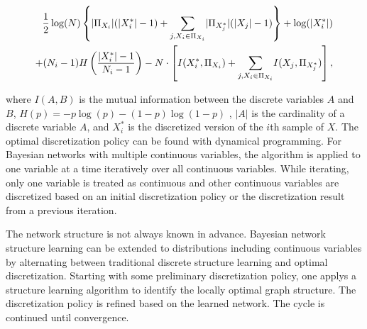 \begin{equation}
\begin{aligned}
\frac{1}{2} \log(N) \left\lbrace  \lvert \Pi_{X_i} \rvert (\lvert X^*_i \rvert - 1) +
 {\sum_{j,X_i \in \Pi_{X_i}}} \lvert \Pi_{X^*_j} \rvert (\lvert X_j \rvert - 1) \right\rbrace + \log(\lvert {X^*_i} \rvert) \\
 + (N_i-1) H \left( {{|X^*_i| - 1}\over{N_i -1}}  \right) -N \cdot \left[ I(X^*_i,\Pi_{X_i}) + {\sum_{j,X_i \in \Pi_{X_i}}} I(X_j, \Pi_{X^*_j}) \right],
\end{aligned}
\end{equation}


\noindent
where $I(A,B)$ is the mutual information between the discrete variables $A$ and $B$, ${H(p) = -p \log(p) - (1-p) \log(1-p)}$ , $|A|$ is the cardinality of a discrete variable $A$, and $X^*_i$ is the discretized version of the $i$th sample of $X$.
The optimal discretization policy can be found with dynamical programming.
For Bayesian networks with multiple continuous variables, the algorithm is applied to one variable at a time iteratively over all continuous variables.
While iterating, only one variable is treated as continuous and other continuous variables are discretized based on an initial discretization policy or the discretization result from a previous iteration.

The network structure is not always known in advance. Bayesian network structure learning can be extended to distributions including continuous variables by alternating between traditional discrete structure learning and optimal discretization. Starting with some preliminary discretization policy, one applys a structure learning algorithm to identify the locally optimal graph structure. The discretization policy is refined based on the learned network. The cycle is continued until convergence.

